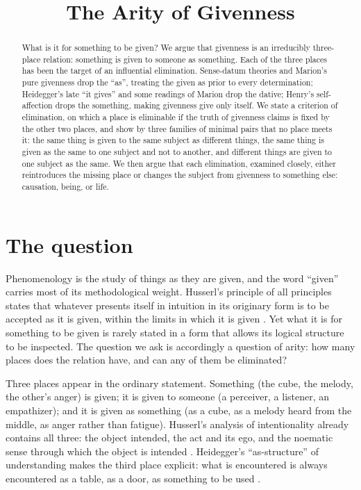 \documentclass{situationist-preprint}
\title{The Arity of Givenness}
\begin{document}
\maketitle

\begin{abstract}
What is it for something to be given? We argue that givenness is an irreducibly three-place relation: something is given to someone as something. Each of the three places has been the target of an influential elimination. Sense-datum theories and Marion's pure givenness drop the \enquote{as}, treating the given as prior to every determination; Heidegger's late \enquote{it gives} and some readings of Marion drop the dative; Henry's self-affection drops the something, making givenness give only itself. We state a criterion of elimination, on which a place is eliminable if the truth of givenness claims is fixed by the other two places, and show by three families of minimal pairs that no place meets it: the same thing is given to the same subject as different things, the same thing is given as the same to one subject and not to another, and different things are given to one subject as the same. We then argue that each elimination, examined closely, either reintroduces the missing place or changes the subject from givenness to something else: causation, being, or life.
\end{abstract}

\section{The question}

Phenomenology is the study of things as they are given, and the word \enquote{given} carries most of its methodological weight. Husserl's principle of all principles states that whatever presents itself in intuition in its originary form is to be accepted as it is given, within the limits in which it is given \citep[§24]{Husserl1913}. Yet what it is for something to be given is rarely stated in a form that allows its logical structure to be inspected. The question we ask is accordingly a question of arity: how many places does the relation have, and can any of them be eliminated?

Three places appear in the ordinary statement. Something (the cube, the melody, the other's anger) is given; it is given to someone (a perceiver, a listener, an empathizer); and it is given as something (as a cube, as a melody heard from the middle, as anger rather than fatigue). Husserl's analysis of intentionality already contains all three: the object intended, the act and its ego, and the noematic sense through which the object is intended \citep[§§88--91]{Husserl1913}. Heidegger's \enquote{as-structure} of understanding makes the third place explicit: what is encountered is always encountered as a table, as a door, as something to be used \citep[§32]{Heidegger1927}.
\end{document}
